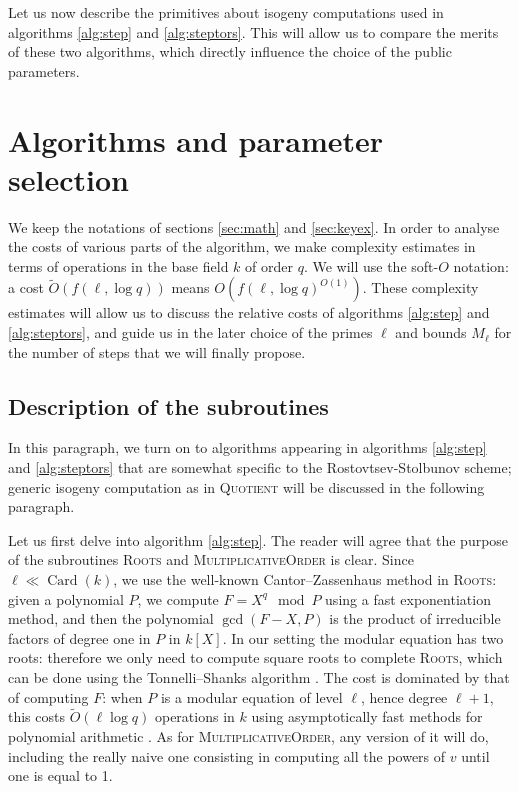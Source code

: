 \documentclass{article}
\newcommand{\softO}{\tilde{O}}
\newcommand{\algstyle}[1]{\textsc{#1}}
\renewcommand{\v}{\vspace{5mm}}
\theoremstyle{definition}
\DeclareMathOperator{\Card}{Card}
\begin{document}
Let us now describe the primitives about isogeny computations used in algorithms
\ref{alg:step} and \ref{alg:steptors}. This will allow us to compare the merits
of these two algorithms, which directly influence the choice of the public
parameters.


\section{Algorithms and parameter selection}
\label{sec:alg}

We keep the notations of sections \ref{sec:math}
and \ref{sec:keyex}. In order to analyse the costs of various parts of the
algorithm, we make complexity estimates in terms of operations in the
base field $k$ of order $q$.
We will use the soft-$O$ notation: a cost $\softO(f(\ell, \log q))$ means
$O(f(\ell, \log q)^{O(1)})$. These complexity estimates will
allow us to discuss the relative costs of algorithms \ref{alg:step} and
\ref{alg:steptors}, and guide us in the later choice of the primes $\ell$
and bounds $M_\ell$ for the number of steps that we will finally propose.

\subsection{Description of the subroutines}

In this paragraph, we turn on to algorithms appearing in algorithms \ref{alg:step}
and \ref{alg:steptors} that are somewhat specific to the Rostovtsev-Stolbunov
scheme; generic isogeny computation as in \algstyle{Quotient} will be discussed
in the following paragraph.
\v

Let us first delve into algorithm \ref{alg:step}.
The reader will agree that the purpose of the subroutines \algstyle{Roots}
and \algstyle{MultiplicativeOrder} is clear. Since $\ell\ll\Card(k)$,
we use the well-known Cantor--Zassenhaus method \cite{} in \algstyle{Roots}:
given a polynomial $P$,
we compute $F = X^q \mod P$ using a fast exponentiation method, and then the polynomial
$\gcd(F - X, P)$ is the product of irreducible factors of degree one in $P$
in $k[X]$. In our setting the modular equation has two roots: therefore we only need
to compute square roots to complete \algstyle{Roots}, which can be
done using the Tonnelli--Shanks algorithm \cite{}. The cost is dominated
by that of computing $F$: when $P$ is a modular equation
of level $\ell$, hence degree $\ell + 1$, this costs $\softO(\ell\log q)$ operations in $k$
using asymptotically fast methods for polynomial arithmetic \cite{}.
As for \algstyle{MultiplicativeOrder},
any version of it will do, including the really naive one consisting in computing
all the powers of $v$ until one is equal to 1.
\end{document}
